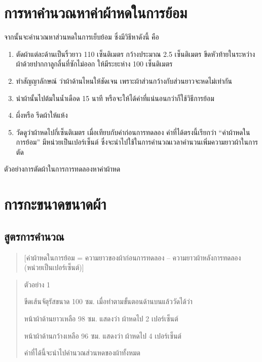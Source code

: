 \section{การหาคำนวณหาค่าผ้าหดในการย้อม}

จากนั้นจะคำนวณหาส่วนหดในการเย็บย้อม ซึ่งมีวิธีหาดังนี้ คือ

\begin{enumerate}
\def\labelenumi{(\arabic{enumi})}
\item
  ตัดผ้าแต่ละด้านเป็นริ้วยาว 110 เซ็นติเมตร กว้างประมาณ 2.5 เซ็นติเมตร
  ขีดหัวท้ายในระหว่างผ้าด้วยปากกาลูกลื่นที่ซักไม่ออก ให้มีระยะห่าง 100
  เซ็นติเมตร
\item
  ทำสัญญาลักษณ์ ว่าผ้าด้านไหนให้ชัดเจน
  เพราะผ้าส่วนกว้างกับส่วนยาวจะหดไม่เท่ากัน
\item
  นำผ้านั้นไปต้มในน้ำเดือด 15 นาที
  หรือจะให้ได้ค่าที่แน่นอนกว่าก็ใช้วิธีการย้อม
\item
  ผึ่งหรือ รีดผ้าให้แห้ง
\item
  วัดดูว่าผ้าหดไปกี่เซ็นติเมตร เมื่อเทียบกับค่าก่อนการทดลอง
  ค่าที่ได้ตรงนี้เรียกว่า ``ค่าผ้าหดในการย้อม'' มีหน่วยเป็นเปอร์เซ็นต์
  ซึ่งจะนำไปใช้ในการคำนวณเวลาคำนวนเพิ่มความยาวผ้าในการตัด
\end{enumerate}


ตัวอย่างการตัดผ้าในการการทดลองหาค่าผ้าหด

\section{การกะขนาดขนาดผ้า}

\subsection{สูตรการคำนวณ}

\begin{quote}
{[}ค่าผ้าหดในการย้อม = ความยาวของผ้าก่อนการทดลอง --
ความยาวผ้าหลังการทดลอง (หน่วยเป็นเปอร์เซ็นต์){]}
\end{quote}

\begin{quote}
ตัวอย่าง 1

ขีดเส้นจัตุรัสขนาด 100 ซม. เมื่อทำตามขั้นตอนด้านบนแล้ววัดได้ว่า

หน้าผ้าด้านยาวเหลือ 98 ซม. แสดงว่า ผ้าหดไป 2 เปอร์เซ็นต์

หน้าผ้าด้านกว้างเหลือ 96 ซม. แสดงว่า ผ้าหดไป 4 เปอร์เซ็นต์

ค่าที่ได้นี้จะนำไปคำนวณส่วนหดของผ้าทั้งหมด
\end{quote}

